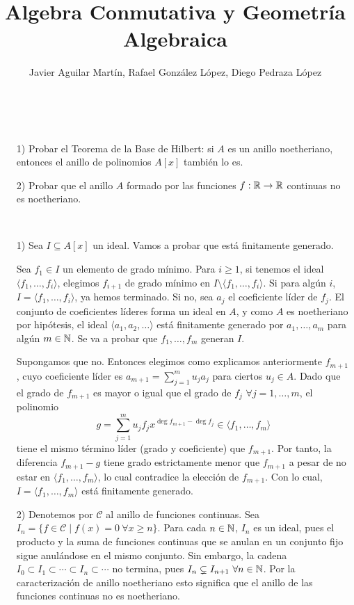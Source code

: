 \documentclass[twoside]{article}
\begin{document}
\title{Algebra Conmutativa y Geometría Algebraica}
\author{Javier Aguilar Martín, Rafael González López, Diego Pedraza López}
\maketitle

\begin{ejercicio}{1}\
\begin{itemize}

\item[1)] Probar el Teorema de la Base de Hilbert: si $A$ es un anillo
noetheriano, entonces el anillo de polinomios $A[x]$ también lo es.

\item[2)] Probar que el anillo $A$ formado por las funciones $f : \mathbb{R} \to \mathbb{R}$ continuas
no es noetheriano.
\end{itemize}
\end{ejercicio}
\begin{solucion}\
\begin{itemize}


\item[1)]Sea $I\subseteq A[x]$ un ideal. Vamos a probar que está finitamente generado. 

Sea $f_1\in I$ un elemento de grado mínimo. Para $i\geq 1$, si tenemos el ideal $\langle f_1,\dots, f_i\rangle$, elegimos $f_{i+1}$ de grado mínimo en $I\setminus\langle f_1,\dots, f_i\rangle$. Si para algún $i$, $I=\langle f_1,\dots, f_i\rangle$, ya hemos terminado. Si no, sea $a_j$ el coeficiente líder de $f_j$. El conjunto de coeficientes líderes forma un ideal en $A$, y como $A$ es noetheriano por hipótesis, el ideal $\langle a_1,a_2,\dots\rangle$ está finitamente generado por $a_1,\dots,a_m$ para algún $m\in\mathbb{N}$. Se va a probar que $f_1,\dots,f_m$ generan $I$.

Supongamos que no. Entonces elegimos como explicamos anteriormente $f_{m+1}$, cuyo coeficiente líder es $a_{m+1}=\sum_{j=1}^m u_j a_j$ para ciertos $u_j\in A$. Dado que el grado de $f_{m+1}$ es mayor o igual que el grado de $f_j$ $\forall j=1,\dots, m$, el polinomio
$$g=\sum_{j=1}^m u_j f_j x^{\deg{f_{m+1}}-\deg{f_j}}\in\langle f_1,\dots,f_m\rangle$$
tiene el mismo término líder (grado y coeficiente) que $f_{m+1}$. Por tanto, la diferencia $f_{m+1}-g$ tiene grado estrictamente menor que $f_{m+1}$ a pesar de no estar en $\langle f_1,\dots,f_m\rangle$, lo cual contradice la elección de $f_{m+1}$. Con lo cual, $I=\langle f_1,\dots,f_m\rangle$ está finitamente generado.

\item[2)] Denotemos por $\mathcal{C}$ al anillo de funciones continuas. Sea $I_n=\{f\in\mathcal{C}\mid f(x)=0\ \forall x\geq n\}$. Para cada $n\in\mathbb{N}$, $I_n$ es un ideal, pues el producto y la suma de funciones continuas que se anulan en un conjunto fijo sigue anulándose en el mismo conjunto. Sin embargo, la cadena $I_0\subset I_1\subset\cdots\subset I_n\subset\cdots$ no termina, pues $I_{n}\subsetneq I_{n+1}\ \forall n\in\N$. Por la caracterización de anillo noetheriano esto significa que el anillo de las funciones continuas no es noetheriano. 
\end{itemize}
\end{solucion}
\end{document}
